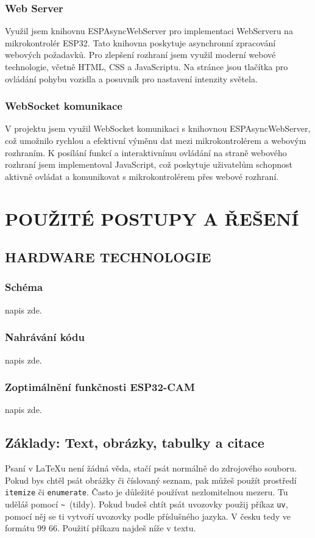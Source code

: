 \documentclass[12pt, a4paper,
oneside,      %
openany
]{report}
\begin{document}
\subsection{Web Server}
\noindent Využil jsem knihovnu ESPAsyncWebServer pro implementaci WebServeru na mikrokontrolér ESP32. Tato knihovna poskytuje asynchronní zpracování webových požadavků. Pro zlepšení rozhraní jsem využil moderní webové technologie, včetně HTML, CSS a JavaScriptu. Na stránce jsou tlačítka pro ovládání pohybu vozidla a posuvník pro nastavení intenzity světela.

\subsection{WebSocket komunikace}
\noindent V projektu jsem využil WebSocket komunikaci s knihovnou ESPAsyncWebServer, což umožnilo rychlou a efektivní výměnu dat mezi mikrokontrolérem a webovým rozhraním. K posílání funkcí a interaktivnímu ovládání na straně webového rozhraní jsem implementoval JavaScript, což poskytuje uživatelům schopnost aktivně ovládat a komunikovat s mikrokontrolérem přes webové rozhraní.

\chapter{POUŽITÉ POSTUPY A ŘEŠENÍ}

\section{HARDWARE TECHNOLOGIE}

\subsection{Schéma}
napis zde.

\subsection{Nahrávání kódu}
napis zde.

\subsection{Zoptimálnění funkčnosti ESP32-CAM}
napis zde.


	\section[Základy]{Základy: Text, obrázky, tabulky a citace} %
	Psaní v \LaTeX{u} není žádná věda, stačí psát normálně do zdrojového souboru. Pokud bys chtěl psát obrážky či číslovaný seznam, pak můžeš použít prostředí \texttt{itemize} či \texttt{enumerate}. Často je důležité používat nezlomitelnou mezeru. Tu uděláš pomocí \verb|~|~(tildy). Pokud budeš chtít psát uvozovky použij příkaz \texttt{uv}, pomocí něj se ti vytvoří uvozovky podle příslušného jazyka. V česku tedy ve formátu 99 66. Použití příkazu najdeš níže v textu.
	
\end{document}
